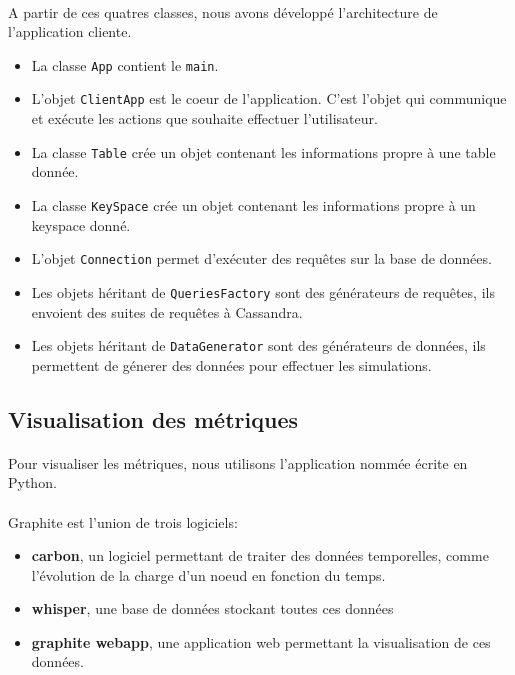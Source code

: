 \documentclass[12pt]{article}
\newcommand{\class}[1]{\texttt{#1}}
\begin{document}
\paragraph{} A partir de ces quatres classes, nous avons développé l'architecture de l'application cliente.
\begin{itemize}
 \item La classe \class{App} contient le \class{main}.
 \item L'objet \class{ClientApp} est le coeur de l'application. C'est l'objet qui communique et exécute les actions que souhaite effectuer l'utilisateur.
 \item La classe \class{Table} crée un objet contenant les informations propre à une table donnée.
 \item La classe \class{KeySpace} crée un objet contenant les informations propre à un keyspace donné.
 \item L'objet \class{Connection} permet d'exécuter des requêtes sur la base de données.
 \item Les objets héritant de \class{QueriesFactory} sont des générateurs de requêtes, ils envoient des suites de requêtes à Cassandra.
 \item Les objets héritant de \class{DataGenerator} sont des générateurs de données, ils permettent de génerer des données pour effectuer les simulations.
\end{itemize}


\subsection{Visualisation des métriques}

\paragraph{} Pour visualiser les métriques, nous utilisons l'application nommée  écrite en Python.

\paragraph{} Graphite est l'union de trois logiciels:
\begin{itemize}
 \item \textbf{carbon}, un logiciel permettant de traiter des données temporelles, comme l'évolution de la charge d'un noeud en fonction du temps.
 \item \textbf{whisper}, une base de données stockant toutes ces données
 \item \textbf{graphite webapp}, une application web permettant la visualisation de ces données.
\end{itemize}
\end{document}
